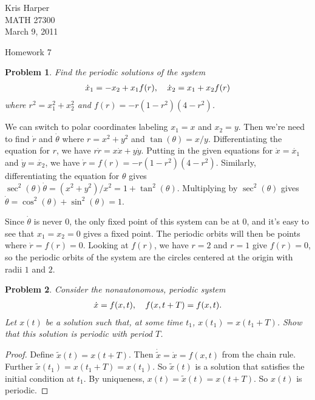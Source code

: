 \documentclass{article}
\newtheorem{problem}{Problem}
\begin{document}
\begin{flushright}
Kris Harper\\

MATH 27300\\

March 9, 2011
\end{flushright}

\begin{center}
Homework 7
\end{center}

\begin{problem}
Find the periodic solutions of the system
\[
\begin{tabular}{cc}
$\dot{x}_1 = -x_2 + x_1f(r)$, & $\dot{x}_2 = x_1 + x_2f(r)$
\end{tabular}
\]
where $r^2 = x_1^2 + x_2^2$ and $f(r) = -r(1-r^2)(4-r^2)$.
\end{problem}

We can switch to polar coordinates labeling $x_1 = x$ and $x_2 = y$. Then we're need to find $\dot{r}$ and $\dot{\theta}$ where $r = x^2 + y^2$ and $\tan(\theta) = x/y$. Differentiating the equation for $r$, we have $r \dot{r} = x \dot{x} + y \dot{y}$. Putting in the given equations for $\dot{x} = \dot{x_1}$ and $\dot{y} = \dot{x_2}$, we have $\dot{r} = f(r) = -r(1-r^2)(4-r^2)$. Similarly, differentiating the equation for $\theta$ gives $\sec^2(\theta) \dot{\theta} = (x^2 + y^2)/x^2 = 1 + \tan^2(\theta)$. Multiplying by $\sec^2(\theta)$ gives $\dot{\theta} = \cos^2(\theta) + \sin^2(\theta) = 1$.

Since $\dot{\theta}$ is never $0$, the only fixed point of this system can be at $0$, and it's easy to see that $x_1 = x_2 = 0$ gives a fixed point. The periodic orbits will then be points where $\dot{r} = f(r) = 0$. Looking at $f(r)$, we have $r = 2$ and $r = 1$ give $f(r) = 0$, so the periodic orbits of the system are the circles centered at the origin with radii $1$ and $2$.

\begin{problem}
Consider the \emph{nonautonomous}, periodic system
\[
\begin{tabular}{cc}
$\dot{x} = f(x,t)$, & $f(x,t+T) = f(x,t)$.
\end{tabular}
\]
Let $x(t)$ be a solution such that, at some time $t_1$, $x(t_1) = x(t_1 + T)$. Show that this solution is periodic with period $T$.
\end{problem}
\begin{proof}
Define $\widetilde{x}(t) = x(t + T)$. Then $\dot{\widetilde{x}} = \dot{x} = f(x,t)$ from the chain rule. Further $\widetilde{x}(t_1) = x(t_1 + T) = x(t_1)$. So $\widetilde{x}(t)$ is a solution that satisfies the initial condition at $t_1$. By uniqueness, $x(t) = \widetilde{x}(t) = x(t + T)$. So $x(t)$ is periodic.
\end{proof}
\end{document}

